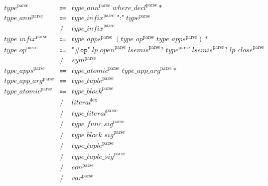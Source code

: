 \begin{align*}
    \begin{array}{rcll}
        \mathit{type}^\mathrm{parse}
        &\Coloneq &\mathit{type\_ann}^\mathrm{parse}\; \mathit{where\_decl}^\mathrm{parse}{*} \\
        \mathit{type\_ann}^\mathrm{parse}
        &\Coloneq &\mathit{type\_infix}^\mathrm{parse}\; \texttt{":"}\; \mathit{type}^\mathrm{parse} \\
        &\mathrel{/} &\mathit{type\_infix}^\mathrm{parse} \\
        \mathit{type\_infix}^\mathrm{parse}
        &\Coloneq &\mathit{type\_apps}^\mathrm{parse}\; (\mathit{type\_op}^\mathrm{parse}\; \mathit{type\_apps}^\mathrm{parse}){*} \\
        \mathit{type\_op}^\mathrm{parse}
        &\Coloneq &\texttt{"\#op"}\; \mathit{lp\_open}^\mathrm{parse}\; \mathit{lsemis}^\mathrm{parse}{?}\; \mathit{type}^\mathrm{parse}\; \mathit{lsemis}^\mathrm{parse}{?}\; \mathit{lp\_close}^\mathrm{parse} \\
        &\mathrel{/} &\mathit{sym}^\mathrm{parse} \\
        \mathit{type\_apps}^\mathrm{parse}
        &\Coloneq &\mathit{type\_atomic}^\mathrm{parse}\; \mathit{type\_app\_arg}^\mathrm{parse}{*} \\
        \mathit{type\_app\_arg}^\mathrm{parse}
        &\Coloneq &\mathit{type\_tuple}^\mathrm{parse} \\
        \mathit{type\_atomic}^\mathrm{parse}
        &\Coloneq &\mathit{type\_block}^\mathrm{parse} \\
        &\mathrel{/} &\mathit{literal}^\mathrm{lex} \\
        &\mathrel{/} &\mathit{type\_literal}^\mathrm{parse} \\
        &\mathrel{/} &\mathit{type\_func\_sig}^\mathrm{parse} \\
        &\mathrel{/} &\mathit{type\_block\_sig}^\mathrm{parse} \\
        &\mathrel{/} &\mathit{type\_tuple}^\mathrm{parse} \\
        &\mathrel{/} &\mathit{type\_tuple\_sig}^\mathrm{parse} \\
        &\mathrel{/} &\mathit{con}^\mathrm{parse} \\
        &\mathrel{/} &\mathit{var}^\mathrm{parse}
    \end{array}
\end{align*}

